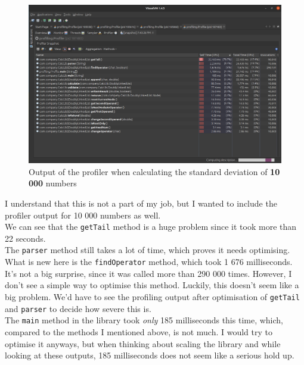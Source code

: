 \documentclass[12pt]{article}
\begin{document}
    \begin{figure}
      \begin{center}
        \includegraphics[width=16cm]{profiling_result-10000_numbers.eps}
        \caption{Output of the profiler when calculating the standard deviation of \textbf{10 000} numbers}
      \end{center}
    \end{figure}

    I understand that this is not a part of my job, but I wanted to include 
    the profiler output for 10 000 numbers as well. \\

    We can see that the \texttt{getTail} method is a huge problem since it took
    more than 22 seconds. \\

    The \texttt{parser} method still takes a lot of time, which proves it
    needs optimising. \\

    What is new here is the \texttt{findOperator} method, which took 1 676 
    milliseconds. It's not a big surprise, since it was called more than
    290 000 times. However, I don't see a simple way to optimise this method.
    Luckily, this doesn't seem like a big problem. We'd have to see
    the profiling output after optimisation of \texttt{getTail} and 
    \texttt{parser} to decide how severe this is. \\

    The \texttt{main} method in the library took \textit{only} 185 milliseconds
    this time, which, compared to the methods I mentioned above, is not
    much. I would try to optimise it anyways, but when thinking about
    scaling the library and while looking at these outputs, 185 milliseconds
    does not seem like a serious hold up.
\end{document}

